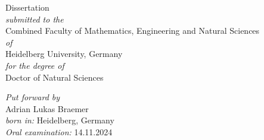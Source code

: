 \thispagestyle{empty}
\begin{center}
\large




\LARGE
Dissertation\\
\vspace{1cm}
\large
\textit{submitted to the}\\\vspace{0.5cm}
Combined Faculty of Mathematics, Engineering and Natural Sciences\\\vspace{0.5cm}
\textit{of}\\\vspace{0.5cm}
Heidelberg University, Germany\\\vspace{0.5cm}
\textit{for the degree of}\\\vspace{0.5cm}
Doctor of Natural Sciences

\vfill

\textit{Put forward by}\\\vspace{0.5cm}
Adrian Lukas Braemer\\\vspace{0.5cm}
\textit{born in:} Heidelberg, Germany\\\vspace{0.5cm}
\textit{Oral examination:} 14.11.2024



\end{center}
